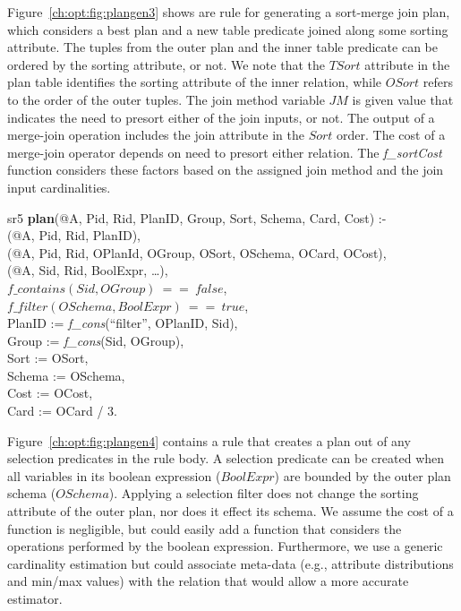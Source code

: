 Figure~\ref{ch:opt:fig:plangen3} shows are rule for generating a sort-merge
join plan, which considers a best plan and a new table predicate joined along
some sorting attribute.  The tuples from the outer plan and the inner table
predicate can be ordered by the sorting attribute, or not.  We note that the
$TSort$ attribute in the  plan table identifies the sorting
attribute of the inner relation, while $OSort$ refers to the order of the outer
tuples.  The join method variable $JM$ is given value that indicates the need
to presort either of the join inputs, or not.  The output of a merge-join
operation includes the join attribute in the $Sort$ order.  The cost of a
merge-join operator depends on need to presort either relation.  The {\em
f\_sortCost} function considers these factors based on the assigned join method
and the join input cardinalities.

\begin{figure*}
\ssp
\centering
\begin{boxedminipage}{\linewidth}

sr5 {\bf plan}(@A, Pid, Rid, PlanID, Group, Sort, Schema, Card, Cost) :- \\
(@A, Pid, Rid, PlanID),\\
(@A, Pid, Rid, OPlanId, OGroup, OSort, OSchema, OCard, OCost), \\
(@A, Sid, Rid, BoolExpr, \ldots), \\
\datalogspace $f\_contains(Sid, OGroup)\ ==\ false$, \\
\datalogspace $f\_filter(OSchema, BoolExpr)\ ==\ true$, \\
\datalogspace PlanID := {\em f\_cons}(``filter'', OPlanID, Sid), \\
\datalogspace Group  := {\em f\_cons}(Sid, OGroup), \\
\datalogspace Sort   := OSort, \\
\datalogspace Schema := OSchema, \\
\datalogspace Cost   := OCost, \\
\datalogspace Card   := OCard / 3.

\end{boxedminipage}
\caption{\label{ch:opt:fig:plangen4}selection predicate filter plan.}
\end{figure*}

Figure~\ref{ch:opt:fig:plangen4} contains a rule that creates a plan out of any
selection predicates in the rule body.  A selection predicate can be created
when all variables in its boolean expression ($BoolExpr$) are bounded by the
outer plan schema ($OSchema$).  Applying a selection filter does not change the
sorting attribute of the outer plan, nor does it effect its schema.  We assume
the cost of a function is negligible, but could easily add a function that
considers the operations performed by the boolean expression.  Furthermore, we
use a generic cardinality estimation but could associate meta-data (e.g.,
attribute distributions and min/max values) with the  relation that
would allow a more accurate estimator.

